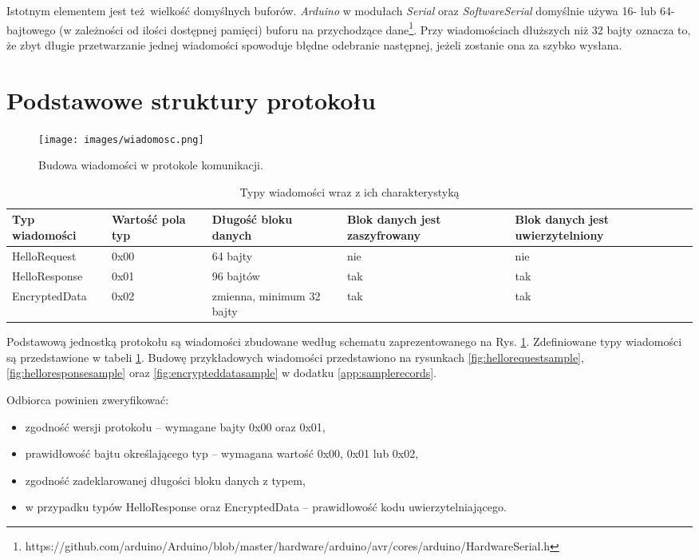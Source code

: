 Istotnym elementem jest też wielkość domyślnych buforów. \emph{Arduino} w modułach \emph{Serial} oraz \emph{SoftwareSerial} domyślnie używa 16- lub 64-bajtowego (w zależności od ilości dostępnej pamięci) buforu na przychodzące dane\footnote{https://github.com/arduino/Arduino/blob/master/hardware/arduino/avr/cores/arduino/HardwareSerial.h}. Przy wiadomościach dłuższych niż 32 bajty oznacza to, że zbyt długie przetwarzanie jednej wiadomości spowoduje błędne odebranie następnej, jeżeli zostanie ona za szybko wysłana.

\section{Podstawowe struktury protokołu}
\label{sec:proto}

\begin{figure}[h]
\centering
\texttt{[image: images/wiadomosc.png]}
\caption{Budowa wiadomości w protokole komunikacji.}
\label{fig:message-def}
\end{figure}

\begin{table}[t]
\centering
\caption{Typy wiadomości wraz z ich charakterystyką}
\begin{tabular}{|p{2.3cm}|p{1.4cm}|l|p{2.9cm}|p{3.1cm}|}
    \hline
    \textbf{Typ \mbox{wiadomości}}  &
    \textbf{Wartość pola typ}  &
    \textbf{Długość bloku danych}  &
    \textbf{Blok danych jest zaszyfrowany}  &
    \textbf{Blok danych jest uwierzytelniony}\\
    \hline
    HelloRequest & 0x00 & 64 bajty & nie & nie\\
    \hline
    HelloResponse & 0x01 & 96 bajtów & tak & tak\\
    \hline
    EncryptedData & 0x02 & zmienna, minimum 32 bajty & tak & tak\\
    \hline
\end{tabular}
\label{tab:recordtypes}
\end{table}

Podstawową jednostką protokołu są wiadomości zbudowane według schematu zaprezentowanego na Rys. \ref{fig:message-def}. Zdefiniowane typy wiadomości są przedstawione w tabeli \ref{tab:recordtypes}. Budowę przykładowych wiadomości przedstawiono na rysunkach \ref{fig:hellorequestsample}, \ref{fig:helloresponsesample} oraz \ref{fig:encrypteddatasample} w dodatku \ref{app:samplerecords}.

Odbiorca powinien zweryfikować:

\begin{itemize}
\item zgodność wersji protokołu -- wymagane bajty 0x00 oraz 0x01,
\item prawidłowość bajtu określającego typ -- wymagana wartość 0x00, 0x01 lub 0x02,
\item zgodność zadeklarowanej długości bloku danych z typem,
\item w przypadku typów HelloResponse oraz EncryptedData -- prawidłowość kodu uwierzytelniającego.
\end{itemize}


